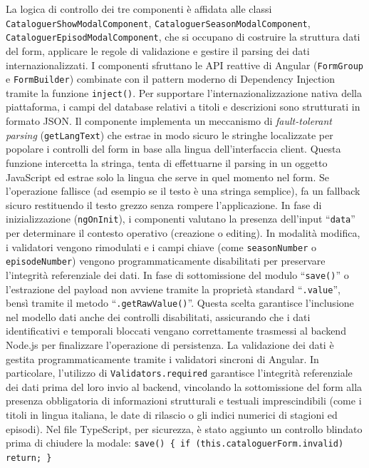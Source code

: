 \documentclass[11pt,a4paper]{article}
\begin{document}
\begin{itemize}
    La logica di controllo dei tre componenti è affidata alle classi \texttt{CataloguerShowModalComponent}, \texttt{CataloguerSeasonModalComponent}, \texttt{CataloguerEpisodModalComponent}, che si occupano di costruire la struttura dati del form, applicare le regole di validazione e gestire il parsing dei dati internazionalizzati. I componenti sfruttano le API reattive di Angular (\texttt{FormGroup} e \texttt{FormBuilder}) combinate con il pattern moderno di Dependency Injection tramite la funzione \texttt{inject()}. Per supportare l'internazionalizzazione nativa della piattaforma, i campi del database relativi a titoli e descrizioni sono strutturati in formato JSON. Il componente implementa un meccanismo di \textit{fault-tolerant parsing} (\texttt{getLangText}) che estrae in modo sicuro le stringhe localizzate per popolare i controlli del form in base alla lingua dell'interfaccia client. Questa funzione intercetta la stringa, tenta di effettuarne il parsing in un oggetto JavaScript ed estrae solo la lingua che serve in quel momento nel form. Se l'operazione fallisce (ad esempio se il testo è una stringa semplice), fa un fallback sicuro restituendo il testo grezzo senza rompere l'applicazione. In fase di inizializzazione (\texttt{ngOnInit}), i componenti valutano la presenza dell'input ``\texttt{data}'' per determinare il contesto operativo (creazione o editing). In modalità modifica, i validatori vengono rimodulati e i campi chiave (come \texttt{seasonNumber} o \texttt{episodeNumber}) vengono programmaticamente disabilitati per preservare l'integrità referenziale dei dati. In fase di sottomissione del modulo ``\texttt{save()}'' o l'estrazione del payload non avviene tramite la proprietà standard ``\texttt{.value}'', bensì tramite il metodo ``\texttt{.getRawValue()}''. Questa scelta garantisce l'inclusione nel modello dati anche dei controlli disabilitati, assicurando che i dati identificativi e temporali bloccati vengano correttamente trasmessi al backend Node.js per finalizzare l'operazione di persistenza. La validazione dei dati è gestita programmaticamente tramite i validatori sincroni di Angular. In particolare, l'utilizzo di \texttt{Validators.required} garantisce l'integrità referenziale dei dati prima del loro invio al backend, vincolando la sottomissione del form alla presenza obbligatoria di informazioni strutturali e testuali imprescindibili (come i titoli in lingua italiana, le date di rilascio o gli indici numerici di stagioni ed episodi). Nel file TypeScript, per sicurezza, è stato aggiunto un controllo blindato prima di chiudere la modale: \texttt{save() \{ if (this.cataloguerForm.invalid) return; \}}

\end{itemize}
\end{document}
